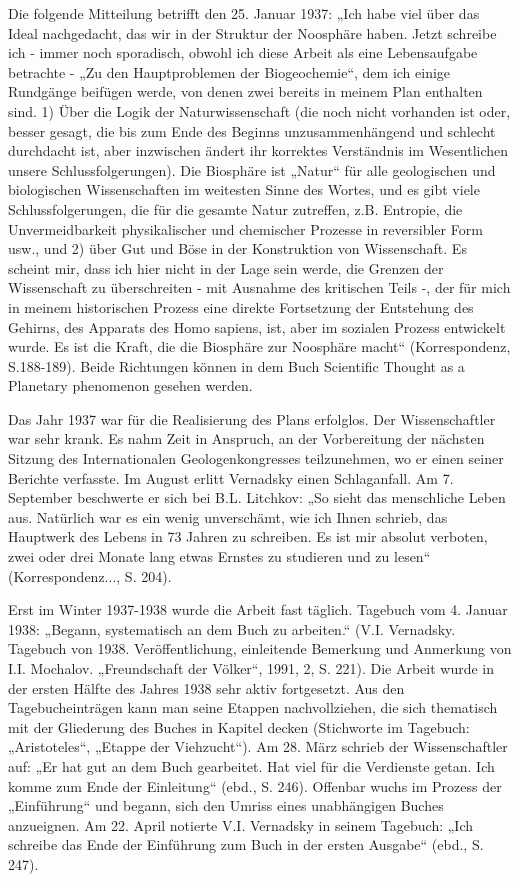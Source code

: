 \documentclass[11pt,a4paper]{article}
\begin{document}
Die folgende Mitteilung betrifft den 25. Januar 1937: „Ich habe viel über das
Ideal nachgedacht, das wir in der Struktur der Noosphäre haben. Jetzt schreibe
ich - immer noch sporadisch, obwohl ich diese Arbeit als eine Lebensaufgabe
betrachte - „Zu den Hauptproblemen der Biogeochemie“, dem ich einige Rundgänge
beifügen werde, von denen zwei bereits in meinem Plan enthalten sind. 1) Über
die Logik der Naturwissenschaft (die noch nicht vorhanden ist oder, besser
gesagt, die bis zum Ende des Beginns unzusammenhängend und schlecht durchdacht
ist, aber inzwischen ändert ihr korrektes Verständnis im Wesentlichen unsere
Schlussfolgerungen). Die Biosphäre ist „Natur“ für alle geologischen und
biologischen Wissenschaften im weitesten Sinne des Wortes, und es gibt viele
Schlussfolgerungen, die für die gesamte Natur zutreffen, z.B. Entropie, die
Unvermeidbarkeit physikalischer und chemischer Prozesse in reversibler Form
usw., und 2) über Gut und Böse in der Konstruktion von Wissenschaft. Es
scheint mir, dass ich hier nicht in der Lage sein werde, die Grenzen der
Wissenschaft zu überschreiten - mit Ausnahme des kritischen Teils -, der für
mich in meinem historischen Prozess eine direkte Fortsetzung der Entstehung
des Gehirns, des Apparats des Homo sapiens, ist, aber im sozialen Prozess
entwickelt wurde. Es ist die Kraft, die die Biosphäre zur Noosphäre macht“
(Korrespondenz, S.188-189). Beide Richtungen können in dem Buch Scientific
Thought as a Planetary phenomenon gesehen werden.

Das Jahr 1937 war für die Realisierung des Plans erfolglos. Der
Wissenschaftler war sehr krank. Es nahm Zeit in Anspruch, an der Vorbereitung
der nächsten Sitzung des Internationalen Geologenkongresses teilzunehmen, wo
er einen seiner Berichte verfasste. Im August erlitt Vernadsky einen
Schlaganfall. Am 7. September beschwerte er sich bei B.L. Litchkov: „So sieht
das menschliche Leben aus. Natürlich war es ein wenig unverschämt, wie ich
Ihnen schrieb, das Hauptwerk des Lebens in 73 Jahren zu schreiben. Es ist mir
absolut verboten, zwei oder drei Monate lang etwas Ernstes zu studieren und zu
lesen“ (Korrespondenz..., S. 204).

Erst im Winter 1937-1938 wurde die Arbeit fast täglich. Tagebuch vom 4. Januar
1938: „Begann, systematisch an dem Buch zu arbeiten.“
(V.I. Vernadsky. Tagebuch von 1938. Veröffentlichung, einleitende Bemerkung
und Anmerkung von I.I. Mochalov. „Freundschaft der Völker“, 1991, 2, S. 221).
Die Arbeit wurde in der ersten Hälfte des Jahres 1938 sehr aktiv fortgesetzt.
Aus den Tagebucheinträgen kann man seine Etappen nachvollziehen, die sich
thematisch mit der Gliederung des Buches in Kapitel decken (Stichworte im
Tagebuch: „Aristoteles“, „Etappe der Viehzucht“). Am 28. März schrieb der
Wissenschaftler auf: „Er hat gut an dem Buch gearbeitet. Hat viel für die
Verdienste getan. Ich komme zum Ende der Einleitung“ (ebd., S. 246). Offenbar
wuchs im Prozess der „Einführung“ und begann, sich den Umriss eines
unabhängigen Buches anzueignen. Am 22. April notierte V.I. Vernadsky in seinem
Tagebuch: „Ich schreibe das Ende der Einführung zum Buch in der ersten
Ausgabe“ (ebd., S. 247).
\end{document}
